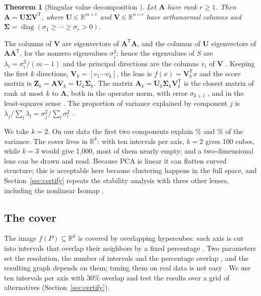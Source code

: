 \documentclass{article}
\newcommand{\R}{\mathbb{R}}
\newtheorem{theorem}{Theorem}[section]
\theoremstyle{definition}
\theoremstyle{remark}
\begin{document}
\begin{theorem}[Singular value decomposition {\parencite{axler2024ladr}}]
Let $\mathbf A$ have rank $r \ge 1$. Then $\mathbf A = \mathbf U \boldsymbol\Sigma \mathbf V^{\mathsf T}$, where $\mathbf U \in \R^{m \times r}$ and $\mathbf V \in \R^{n \times r}$ have orthonormal columns and $\boldsymbol\Sigma = \operatorname{diag}(\sigma_1 \ge \cdots \ge \sigma_r > 0)$.
\end{theorem}
The columns of $\mathbf V$ are eigenvectors of $\mathbf A^{\mathsf T}\mathbf A$, and the columns of $\mathbf U$ eigenvectors of $\mathbf A\mathbf A^{\mathsf T}$, for the nonzero eigenvalues $\sigma_i^2$; hence the eigenvalues of $S$ are $\lambda_i = \sigma_i^2/(m-1)$ and the principal directions are the columns $v_i$ of $\mathbf V$ \parencite{jolliffecadima2016}.
Keeping the first $k$ directions, $\mathbf V_k = [v_1 \cdots v_k]$, the lens is $f(x) = \mathbf V_k^{\mathsf T} x$ and the score matrix is $\mathbf Z_k = \mathbf A \mathbf V_k = \mathbf U_k \boldsymbol\Sigma_k$.
The matrix $\mathbf A_k = \mathbf U_k \boldsymbol\Sigma_k \mathbf V_k^{\mathsf T}$ is the closest matrix of rank at most $k$ to $\mathbf A$, both in the operator norm, with error $\sigma_{k+1}$ \parencite{axler2024ladr}, and in the least-squares sense \parencite{jolliffecadima2016}.
The proportion of variance explained by component $j$ is $\lambda_j / \sum_l \lambda_l = \sigma_j^2 / \sum_l \sigma_l^2$ \parencite{jolliffecadima2016}.

We take $k = 2$. On our data the first two components explain \PCone\% and \PCtwo\% of the variance.
The cover lives in $\R^k$: with ten intervals per axis, $k = 2$ gives 100 cubes, while $k = 3$ would give 1{,}000, most of them nearly empty; and a two-dimensional lens can be drawn and read.
Because PCA is linear it can flatten curved structure; this is acceptable here because clustering happens in the full space, and Section~\ref{sec:certify} repeats the stability analysis with three other lenses, including the nonlinear Isomap \parencite{tenenbaum2000isomap}.

\subsection{The cover}
The image $f(P) \subseteq \R^k$ is covered by overlapping hypercubes: each axis is cut into intervals that overlap their neighbors by a fixed percentage \parencite{singh2007mapper,madukpe2026review}.
Two parameters set the resolution, the number of intervals and the percentage overlap \parencite{singh2007mapper}, and the resulting graph depends on them; tuning them on real data is not easy \parencite{carrieremicheloudot2018}.
We use ten intervals per axis with 30\% overlap and test the results over a grid of alternatives (Section~\ref{sec:certify}).
\end{document}

